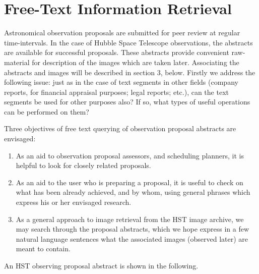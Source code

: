 \section{Free-Text Information Retrieval}

Astronomical observation proposals are submitted for peer review at regular
time-intervals.  In the case of Hubble Space Telescope observations, the
abstracts are available for successful proposals.  These abstracts provide
convenient raw-material for description of the images which are taken later.
Associating  the abstracts and images will be described in section 3, below.  
Firstly we address the following issue: just as in the case of text 
segments in other fields (company reports, for financial appraisal purposes;
legal reports; etc.), can the text segments be used for other purposes also?
If so, what types of useful operations can be performed on them?

Three objectives of free text querying of 
observation proposal abstracts are envisaged:
 
\begin{enumerate}
 
\item As an aid to observation proposal assessors, and scheduling planners,
it is helpful to look for closely related proposals.
 
\item As an aid to the user who is preparing a proposal, it is useful to
check on what has been already achieved, and by whom, using general phrases
which express his or her envisaged research.
 
\item As a general approach to image retrieval from the HST image archive,
we may search through the proposal abstracts, which we hope express in a 
few natural language sentences what the associated images (observed later)
are meant to contain.
 
\end{enumerate}

An  HST observing proposal abstract is shown in the following.
 
